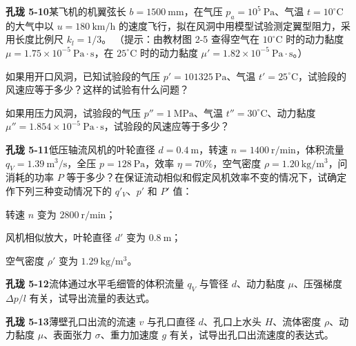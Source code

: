 \begin{ti}
\item \textbf{孔珑 5-10}\quad 某飞机的机翼弦长 $b=1500\ \mathrm{mm}$，在气压 $p_a=10^5\ \mathrm{Pa}$、气温 $t=10^{\circ}\mathrm{C}$ 的大气中以 $u=180\ \mathrm{km/h}$ 的速度飞行，拟在风洞中用模型试验测定翼型阻力，采用长度比例尺 $k_l=1/3$。
（提示：由教材图 2-5 查得空气在 $10^{\circ}\mathrm{C}$ 时的动力黏度 $\mu=1.75\times10^{-5}\ \mathrm{Pa\cdot s}$，在 $25^{\circ}\mathrm{C}$ 时的动力黏度 $\mu'=1.82\times10^{-5}\ \mathrm{Pa\cdot s}$。）
\begin{xiaowen}
\item 如果用开口风洞，已知试验段的气压 $p'=101325\ \mathrm{Pa}$、气温 $t'=25^{\circ}\mathrm{C}$，试验段的风速应等于多少？这样的试验有什么问题？
\item 如果用压力风洞，试验段的气压 $p''=1\ \mathrm{MPa}$、气温 $t''=30^{\circ}\mathrm{C}$、动力黏度 $\mu''=1.854\times10^{-5}\ \mathrm{Pa\cdot s}$，试验段的风速应等于多少？
\end{xiaowen}

\item \textbf{孔珑 5-11}\quad 低压轴流风机的叶轮直径 $d=0.4\ \mathrm{m}$，转速 $n=1400\ \mathrm{r/min}$，体积流量 $q_V=1.39\ \mathrm{m^3/s}$，全压 $p=128\ \mathrm{Pa}$，效率 $\eta=70\%$，空气密度 $\rho=1.20\ \mathrm{kg/m^3}$，问消耗的功率 $P$ 等于多少？在保证流动相似和假定风机效率不变的情况下，试确定作下列三种变动情况下的 $q'_V$、$p'$ 和 $P'$ 值：
\begin{xiaowen}
\item 转速 $n$ 变为 $2800\ \mathrm{r/min}$；
\item 风机相似放大，叶轮直径 $d'$ 变为 $0.8\ \mathrm{m}$；
\item 空气密度 $\rho'$ 变为 $1.29\ \mathrm{kg/m^3}$。
\end{xiaowen}

\item \textbf{孔珑 5-12}\quad 流体通过水平毛细管的体积流量 $q_V$ 与管径 $d$、动力黏度 $\mu$、压强梯度 $\Delta p/l$ 有关，试导出流量的表达式。

\item \textbf{孔珑 5-13}\quad 薄壁孔口出流的流速 $v$ 与孔口直径 $d$、孔口上水头 $H$、流体密度 $\rho$、动力黏度 $\mu$、表面张力 $\sigma$、重力加速度 $g$ 有关，试导出孔口出流速度的表达式。


\end{ti}
